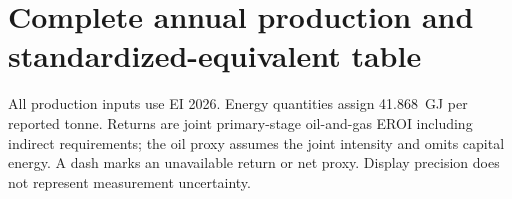 \documentclass[reprint,aps,pra,longbibliography,floatfix]{revtex4-2}
\begin{document}
\twocolumngrid


\onecolumngrid
\noindent\begin{minipage}{\textwidth}
\appendix
\section{Complete annual production and standardized-equivalent table}\label{app:annual}
All production inputs use EI 2026. Energy quantities assign 41.868~GJ per reported tonne. Returns are joint primary-stage oil-and-gas EROI including indirect requirements; the oil proxy assumes the joint intensity and omits capital energy. A dash marks an unavailable return or net proxy. Display precision does not represent measurement uncertainty.


\end{minipage}
\end{document}
